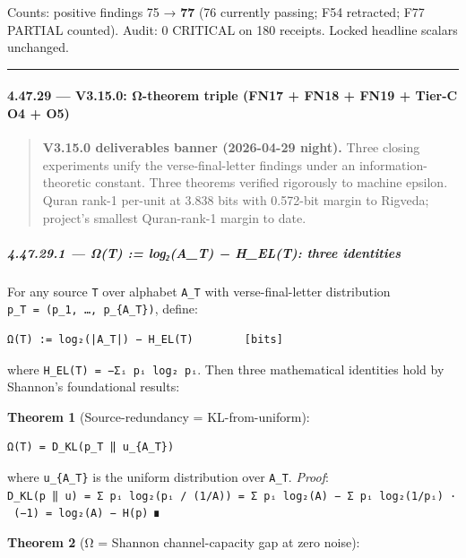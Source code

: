 \documentclass[
]{article}
\begin{document}
Counts: positive findings 75 → \textbf{77} (76 currently passing; F54
retracted; F77 PARTIAL counted). Audit: 0 CRITICAL on 180 receipts.
Locked headline scalars unchanged.

\begin{center}\rule{0.5\linewidth}{0.5pt}\end{center}

\paragraph{4.47.29 --- V3.15.0: Ω-theorem triple (FN17 + FN18 + FN19 +
Tier-C O4 +
O5)}\label{v3.15.0-ux3c9-theorem-triple-fn17-fn18-fn19-tier-c-o4-o5}

\begin{quote}
\textbf{V3.15.0 deliverables banner (2026-04-29 night).} Three closing
experiments unify the verse-final-letter findings under an
information-theoretic constant. Three theorems verified rigorously to
machine epsilon. Quran rank-1 per-unit at 3.838 bits with 0.572-bit
margin to Rigveda; project's smallest Quran-rank-1 margin to date.
\end{quote}

\subparagraph{4.47.29.1 --- Ω(T) := log₂(A\_T) − H\_EL(T): three
identities}\label{ux3c9t-logux2082a_t-h_elt-three-identities}

For any source \texttt{T} over alphabet \texttt{A\_T} with
verse-final-letter distribution
\texttt{p\_T\ =\ (p\_1,\ …,\ p\_\{\textbar{}A\_T\textbar{}\})}, define:

\begin{verbatim}
Ω(T) := log₂(|A_T|) − H_EL(T)        [bits]
\end{verbatim}

where \texttt{H\_EL(T)\ =\ −Σᵢ\ pᵢ\ log₂\ pᵢ}. Then three mathematical
identities hold by Shannon's foundational results:

\textbf{Theorem 1} (Source-redundancy = KL-from-uniform):

\begin{verbatim}
Ω(T) = D_KL(p_T ‖ u_{A_T})
\end{verbatim}

where \texttt{u\_\{A\_T\}} is the uniform distribution over
\texttt{A\_T}. \emph{Proof}:
\texttt{D\_KL(p\ ‖\ u)\ =\ Σ\ pᵢ\ log₂(pᵢ\ /\ (1/\textbar{}A\textbar{}))\ =\ Σ\ pᵢ\ log₂(\textbar{}A\textbar{})\ −\ Σ\ pᵢ\ log₂(1/pᵢ)\ ·\ (−1)\ =\ log₂(\textbar{}A\textbar{})\ −\ H(p)}
∎

\textbf{Theorem 2} (Ω = Shannon channel-capacity gap at zero noise):
\end{document}
